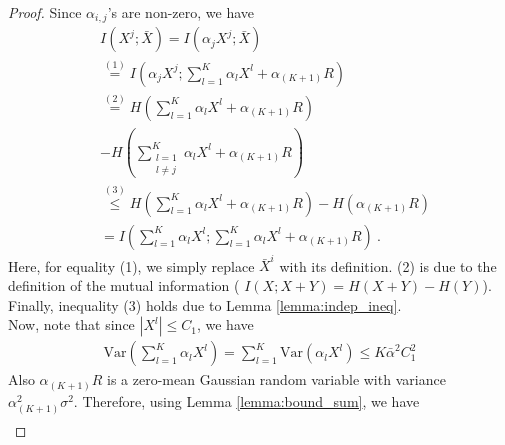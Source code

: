 \begin{proof}
Since $\alpha_{i,j}$'s are non-zero, we have
\begin{align}\label{eq:initial_bound}
    &I\left(X^j;\bar X\right)=I\left(\alpha_{j}X^j;\bar X\right)\nonumber\\
    &\overset{\mathrm{(1)}}{=}I\left(\alpha_{j}X^j;\sum_{l=1}^K \alpha_{l} X^l + \alpha_{(K+1)} R\right)\nonumber\\
    &\overset{\mathrm{(2)}}{=}H\left(\sum_{l=1}^K \alpha_{l} X^l + \alpha_{(K+1)} R\right) \nonumber \\ &- H\left(\sum_{\substack{l=1\\l\neq j}}^K \alpha_{l} X^l + \alpha_{(K+1)} R\right)\nonumber\\
    &\overset{\mathrm{(3)}}{\leq}H\left(\sum_{l=1}^K \alpha_{l} X^l + \alpha_{(K+1)} R\right)- H\left(\alpha_{(K+1)} R\right)\nonumber\\
    &=I\left( \sum_{l=1}^K \alpha_{l} X^l ; \sum_{l=1}^K \alpha_{l} X^l  + \alpha_{(K+1)} R\right)~.
\end{align}
Here, for equality (1), we simply replace $\bar X^i$ with its definition. (2) is due to the definition of the mutual information ( $I(X;X+Y)=H(X+Y)-H(Y)$). Finally, inequality (3) holds due to Lemma \ref{lemma:indep_ineq}. \\
Now, note that since $|X^l|\leq C_1$, we have
\begin{align}
    \text{Var}\left( \sum_{l=1}^K \alpha_{l} X^l \right)=\sum_{l=1}^K \text{Var}\left( \alpha_{l} X^l \right)\leq K\bar\alpha^2 C_1^2
\end{align}
Also $\alpha_{(K+1)}R$ is a zero-mean Gaussian random variable with variance $\alpha_{(K+1)}^2\sigma^2$. Therefore, using Lemma \ref{lemma:bound_sum}, we have
\begin{align}\label{eq:bound_lastpasrt}

\end{align}
\end{proof}
